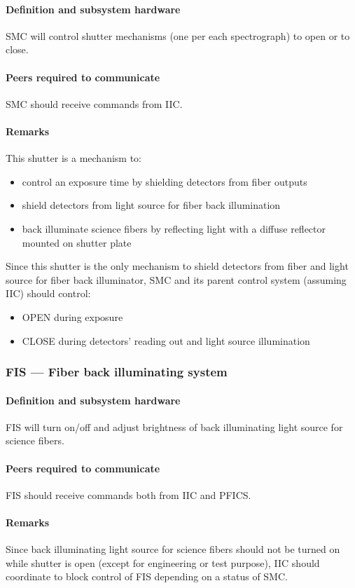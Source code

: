\documentclass[a4paper,notitlepage]{article}
\begin{document}
\paragraph{Definition and subsystem hardware}
SMC will control shutter mechanisms (one per each spectrograph) to open or 
to close. 
\paragraph{Peers required to communicate}
SMC should receive commands from IIC. 
\paragraph{Remarks}
This shutter is a mechanism to: 
\begin{itemize}
  \item control an exposure time by shielding detectors from fiber outputs
  \item shield detectors from light source for fiber back illumination
  \item back illuminate science fibers by reflecting light with a diffuse 
    reflector mounted on shutter plate
\end{itemize}
Since this shutter is the only mechanism to shield detectors from fiber and 
light source for fiber back illuminator, SMC and its parent control system 
(assuming IIC) should control: 
\begin{itemize}
  \item OPEN during exposure
  \item CLOSE during detectors' reading out and light source illumination
\end{itemize}

\subsubsection{FIS --- Fiber back illuminating system}
\paragraph{Definition and subsystem hardware}
FIS will turn on/off and adjust brightness of back illuminating light source 
for science fibers. 
\paragraph{Peers required to communicate}
FIS should receive commands both from IIC and PFICS. 
\paragraph{Remarks}
Since back illuminating light source for science fibers should not be turned 
on while shutter is open (except for engineering or test purpose), IIC should 
coordinate to block control of FIS depending on a status of SMC. 
\end{document}
